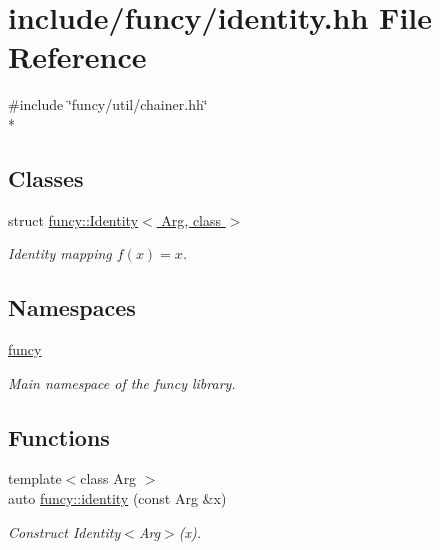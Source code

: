 \hypertarget{identity_8hh}{\section{include/funcy/identity.hh File Reference}
\label{identity_8hh}
}
{\ttfamily \#include \char`\"{}funcy/util/chainer.\-hh\char`\"{}}\\*
\subsection*{Classes}
\begin{DoxyCompactItemize}
\item 
struct \hyperlink{structfuncy_1_1Identity}{funcy\-::\-Identity$<$ Arg, class $>$}
\begin{DoxyCompactList}\small\item\em Identity mapping $ f(x)=x $. \end{DoxyCompactList}\end{DoxyCompactItemize}
\subsection*{Namespaces}
\begin{DoxyCompactItemize}
\item 
\hyperlink{namespacefuncy}{funcy}
\begin{DoxyCompactList}\small\item\em Main namespace of the funcy library. \end{DoxyCompactList}\end{DoxyCompactItemize}
\subsection*{Functions}
\begin{DoxyCompactItemize}
\item 
{\footnotesize template$<$class Arg $>$ }\\auto \hyperlink{namespacefuncy_a04130b4d402d76481d257849ba0ce88d}{funcy\-::identity} (const Arg \&x)
\begin{DoxyCompactList}\small\item\em Construct Identity$<$\-Arg$>$(x). \end{DoxyCompactList}\end{DoxyCompactItemize}
